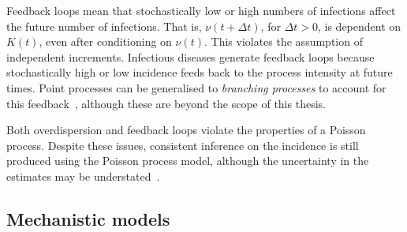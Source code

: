 \documentclass[thesis.tex]{subfiles}
\begin{document}
Feedback loops mean that stochastically low or high numbers of infections affect the future number of infections.
That is, $\nu(t+\Delta t)$, for $\Delta t > 0$, is dependent on $K(t)$, even after conditioning on $\nu(t)$.
This violates the assumption of independent increments.
Infectious diseases generate feedback loops because stochastically high or low incidence feeds back to the process intensity at future times.
Point processes can be generalised to \emph{branching processes} to account for this feedback~\autocite[246]{yanDistribution}, although these are beyond the scope of this thesis.

Both overdispersion and feedback loops violate the properties of a Poisson process.
Despite these issues, consistent inference on the incidence is still produced using the Poisson process model, although the uncertainty in the estimates may be understated~\autocite{beckerDependent}.








\subsection{Mechanistic models} \label{SEIR:sec:mechanistic-models}
\end{document}
